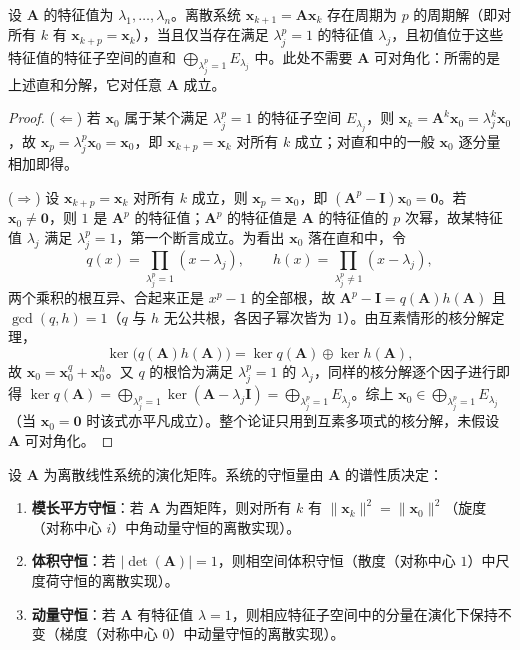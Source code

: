 \begin{proposition}[线性系统的周期解]\label{prop:linear_system_periodic_solution}
设 $\mathbf{A}$ 的特征值为 $\lambda_1, \dots, \lambda_n$。离散系统 $\mathbf{x}_{k+1} = \mathbf{A} \mathbf{x}_k$ 存在周期为 $p$ 的周期解（即对所有 $k$ 有 $\mathbf{x}_{k+p} = \mathbf{x}_k$），当且仅当存在满足 $\lambda_j^p = 1$ 的特征值 $\lambda_j$，且初值位于这些特征值的特征子空间的直和 $\bigoplus_{\lambda_j^p=1}E_{\lambda_j}$ 中。此处不需要 $\mathbf{A}$ 可对角化：所需的是上述直和分解，它对任意 $\mathbf{A}$ 成立。
\end{proposition}

\begin{proof}
($\Leftarrow$) 若 $\mathbf{x}_0$ 属于某个满足 $\lambda_j^p = 1$ 的特征子空间 $E_{\lambda_j}$，则 $\mathbf{x}_k = \mathbf{A}^k\mathbf{x}_0 = \lambda_j^k\mathbf{x}_0$，故 $\mathbf{x}_p = \lambda_j^p\mathbf{x}_0 = \mathbf{x}_0$，即 $\mathbf{x}_{k+p}=\mathbf{x}_k$ 对所有 $k$ 成立；对直和中的一般 $\mathbf{x}_0$ 逐分量相加即得。

($\Rightarrow$) 设 $\mathbf{x}_{k+p}=\mathbf{x}_k$ 对所有 $k$ 成立，则 $\mathbf{x}_p=\mathbf{x}_0$，即 $(\mathbf{A}^p-\mathbf{I})\mathbf{x}_0=\mathbf{0}$。若 $\mathbf{x}_0\ne\mathbf{0}$，则 $1$ 是 $\mathbf{A}^p$ 的特征值；$\mathbf{A}^p$ 的特征值是 $\mathbf{A}$ 的特征值的 $p$ 次幂，故某特征值 $\lambda_j$ 满足 $\lambda_j^p=1$，第一个断言成立。为看出 $\mathbf{x}_0$ 落在直和中，令
\[
q(x)=\prod_{\lambda_j^p=1}(x-\lambda_j),\qquad h(x)=\prod_{\lambda_j^p\ne1}(x-\lambda_j),
\]
两个乘积的根互异、合起来正是 $x^p-1$ 的全部根，故 $\mathbf{A}^p-\mathbf{I}=q(\mathbf{A})h(\mathbf{A})$ 且 $\gcd(q,h)=1$（$q$ 与 $h$ 无公共根，各因子幂次皆为 $1$）。由互素情形的核分解定理，
\[
\ker\bigl(q(\mathbf{A})h(\mathbf{A})\bigr)=\ker q(\mathbf{A})\oplus\ker h(\mathbf{A}),
\]
故 $\mathbf{x}_0=\mathbf{x}_0^{q}+\mathbf{x}_0^{h}$。又 $q$ 的根恰为满足 $\lambda_j^p=1$ 的 $\lambda_j$，同样的核分解逐个因子进行即得 $\ker q(\mathbf{A})=\bigoplus_{\lambda_j^p=1}\ker(\mathbf{A}-\lambda_j\mathbf{I})=\bigoplus_{\lambda_j^p=1}E_{\lambda_j}$。综上 $\mathbf{x}_0\in\bigoplus_{\lambda_j^p=1}E_{\lambda_j}$（当 $\mathbf{x}_0=\mathbf{0}$ 时该式亦平凡成立）。整个论证只用到互素多项式的核分解，未假设 $\mathbf{A}$ 可对角化。
\end{proof}

\begin{theorem}[线性系统的周期守恒律]\label{thm:linear_system_conservation}
设 $\mathbf{A}$ 为离散线性系统的演化矩阵。系统的守恒量由 $\mathbf{A}$ 的谱性质决定：
\begin{enumerate}[label=(\roman*)]
    \item \textbf{模长平方守恒}：若 $\mathbf{A}$ 为酉矩阵，则对所有 $k$ 有 $\|\mathbf{x}_k\|^2 = \|\mathbf{x}_0\|^2$（旋度（对称中心 $i$）中角动量守恒的离散实现）。
    \item \textbf{体积守恒}：若 $|\det(\mathbf{A})| = 1$，则相空间体积守恒（散度（对称中心 $1$）中尺度荷守恒的离散实现）。
    \item \textbf{动量守恒}：若 $\mathbf{A}$ 有特征值 $\lambda = 1$，则相应特征子空间中的分量在演化下保持不变（梯度（对称中心 $0$）中动量守恒的离散实现）。
\end{enumerate}
\end{theorem}

